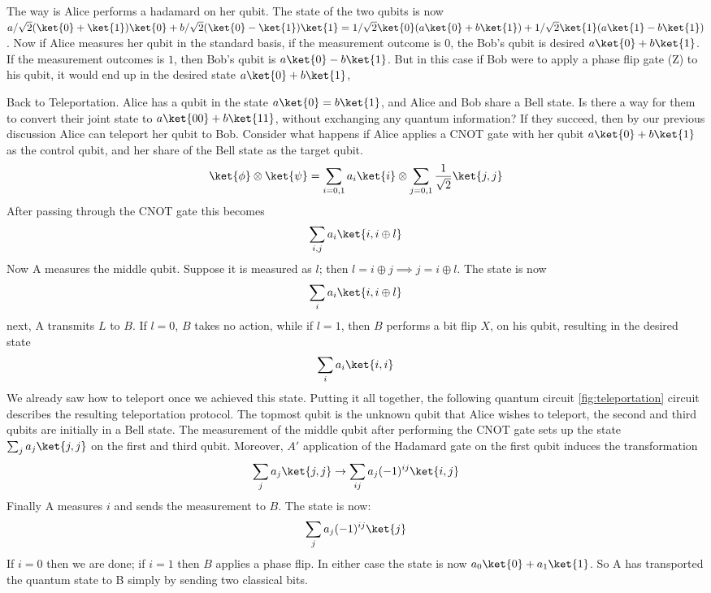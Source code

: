 \documentclass[12pt, oneside]{book}
\theoremstyle{definition}
\theoremstyle{definition}
\theoremstyle{remark}
\begin{document}
    The way is Alice performs a hadamard on her qubit. The state of the two qubits is now $a/\sqrt{2}(\ket{0}+\ket{1})\ket{0}+b/\sqrt{2}(\ket{0}-\ket{1})\ket{1}=1/\sqrt{2}\ket{0}(a\ket{0}+b\ket{1})+1/\sqrt{2}\ket{1}(a\ket{1}-b\ket{1})$. Now if Alice measures her qubit in the standard basis, if the measurement outcome is 0, the Bob's qubit is desired $a\ket{0}+b\ket{1}$. If the measurement outcomes is $1$, then Bob's qubit is $a\ket{0}-b\ket{1}$. But in this case if Bob were to apply a phase flip gate (Z) to his qubit, it would end up in the desired state $a\ket{0}+b\ket{1}$,
    
    Back to Teleportation. Alice has a qubit in the state $a\ket{0}=b\ket{1}$, and Alice and Bob share a Bell state. Is there a way for them to convert their joint state to $a\ket{00}+b\ket{11}$, without exchanging any quantum information? If they succeed, then by our previous discussion Alice can teleport her qubit to Bob. Consider what happens if Alice applies a CNOT gate with her qubit $a\ket{0}+b\ket{1}$ as the control qubit, and her share of the Bell state as the target qubit.
    \[
    \ket{\phi} \otimes \ket{\psi} = \sum_{i=0,1} a_i\ket{i} \otimes \sum_{j=0,1} \frac{1}{\sqrt{2}} \ket{j,j}
    \]
    After passing through the CNOT gate this becomes
    \[
    \sum_{i,j} a_i\ket{i,i \oplus l}
    \]
    Now A measures the middle qubit. Suppose it is measured as $l$; then $l=i\oplus j \implies j=i\oplus l$. The state is now
    \[
    \sum_i a_i\ket{i,i\oplus l}
    \]
    next, A transmits $L$ to $B$. If $l=0$, $B$ takes no action, while if $l=1$, then $B$ performs a bit flip $X$, on his qubit, resulting in the desired state
    \[
    \sum_i a_i\ket{i,i}
    \]
    We already saw how to teleport once we achieved this state. Putting it all together, the following quantum circuit \ref{fig:teleportation} circuit describes the resulting teleportation protocol. The topmost qubit is the unknown qubit that Alice wishes to teleport, the second and third qubits are initially in a Bell state. The measurement of the middle qubit after performing the CNOT gate sets up the state $\sum_j a_j\ket{j,j}$ on the first and third qubit. Moreover, $A'$ application of the Hadamard gate on the first qubit induces the transformation
    \[
    \sum_j a_j\ket{j,j} \rightarrow \sum_{ij} a_j (-1)^{ij} \ket{i,j}
    \]
    Finally A measures $i$ and sends the measurement to $B$. The state is now:
    \[
    \sum_j a_j (-1)^{ij} \ket{j}
    \]
    If $i=0$ then we are done; if $i=1$ then $B$ applies a phase flip. In either case the state is now $a_0\ket{0}+a_1\ket{1}$. So A has transported the quantum state to B simply by sending two classical bits.
\end{document}
